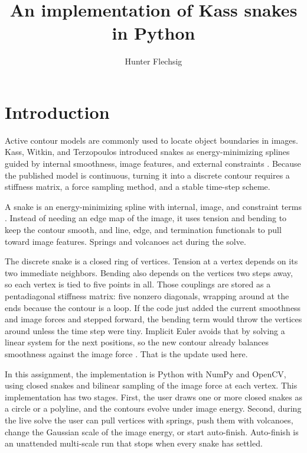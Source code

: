 \documentclass[11pt,twocolumn]{article}
\title{An implementation of Kass snakes in Python}
\author{Hunter Flechsig}
\date{}
\begin{document}
\maketitle

\section{Introduction}

Active contour models are commonly used to locate object boundaries in images. Kass, Witkin, and Terzopoulos introduced snakes as energy-minimizing splines guided by internal smoothness, image features, and external constraints \cite{kass1988snakes}. Because the published model is continuous, turning it into a discrete contour requires a stiffness matrix, a force sampling method, and a stable time-step scheme.

A snake is an energy-minimizing spline with internal, image, and constraint terms \cite{kass1988snakes}. Instead of needing an edge map of the image, it uses tension and bending to keep the contour smooth, and line, edge, and termination functionals to pull toward image features. Springs and volcanoes act during the solve.

The discrete snake is a closed ring of vertices. Tension at a vertex depends on its two immediate neighbors. Bending also depends on the vertices two steps away, so each vertex is tied to five points in all. Those couplings are stored as a pentadiagonal stiffness matrix: five nonzero diagonals, wrapping around at the ends because the contour is a loop. If the code just added the current smoothness and image forces and stepped forward, the bending term would throw the vertices around unless the time step were tiny. Implicit Euler avoids that by solving a linear system for the next positions, so the new contour already balances smoothness against the image force \cite{kass1988snakes}. That is the update used here.

In this assignment, the implementation is Python with NumPy and OpenCV, using closed snakes and bilinear sampling of the image force at each vertex. This implementation has two stages. First, the user draws one or more closed snakes as a circle or a polyline, and the contours evolve under image energy. Second, during the live solve the user can pull vertices with springs, push them with volcanoes, change the Gaussian scale of the image energy, or start auto-finish. Auto-finish is an unattended multi-scale run that stops when every snake has settled.
\end{document}
